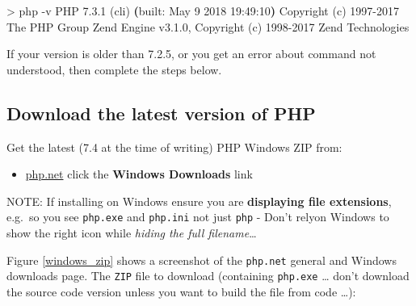 \documentclass[a4paperpaper,openright]{book}
\newenvironment{Shaded}{}{}
\newcommand{\ExtensionTok}[1]{#1}
\newcommand{\KeywordTok}[1]{\textcolor[rgb]{0.00,0.44,0.13}{\textbf{#1}}}
\newcommand{\NormalTok}[1]{#1}
\newcommand{\OperatorTok}[1]{\textcolor[rgb]{0.40,0.40,0.40}{#1}}
\providecommand{\tightlist}{%
  \setlength{\itemsep}{0pt}\setlength{\parskip}{0pt}}
\begin{document}
\begin{Shaded}
\begin{Highlighting}[]
    \OperatorTok{>} \ExtensionTok{php}\NormalTok{ -v}
    \ExtensionTok{PHP}\NormalTok{ 7.3.1 (cli) }\KeywordTok{(}\ExtensionTok{built}\NormalTok{: May  9 2018 19:49:10}\KeywordTok{)}
    \ExtensionTok{Copyright}\NormalTok{ (c) }\ExtensionTok{1997-2017}\NormalTok{ The PHP Group}
    \ExtensionTok{Zend}\NormalTok{ Engine v3.1.0, Copyright (c) }\ExtensionTok{1998-2017}\NormalTok{ Zend Technologies}
\end{Highlighting}
\end{Shaded}

If your version is older than 7.2.5, or you get an error about command
not understood, then complete the steps below.

\hypertarget{download-the-latest-version-of-php}{%
\subsection{Download the latest version of
PHP}\label{download-the-latest-version-of-php}}

Get the latest (7.4 at the time of writing) PHP Windows ZIP from:

\begin{itemize}
\tightlist
\item
  \href{http://php.net/downloads.php}{php.net} click the \textbf{Windows
  Downloads} link
\end{itemize}

NOTE: If installing on Windows ensure you are \textbf{displaying file
extensions}, e.g.~so you see \texttt{php.exe} and \texttt{php.ini} not
just \texttt{php} - Don't relyon Windows to show the right icon while
\emph{hiding the full filename}\ldots{}

Figure \ref{windows_zip} shows a screenshot of the \texttt{php.net}
general and Windows downloads page. The \texttt{ZIP} file to download
(containing \texttt{php.exe} \ldots{} don't download the source code
version unless you want to build the file from code \ldots{}):
\end{document}
